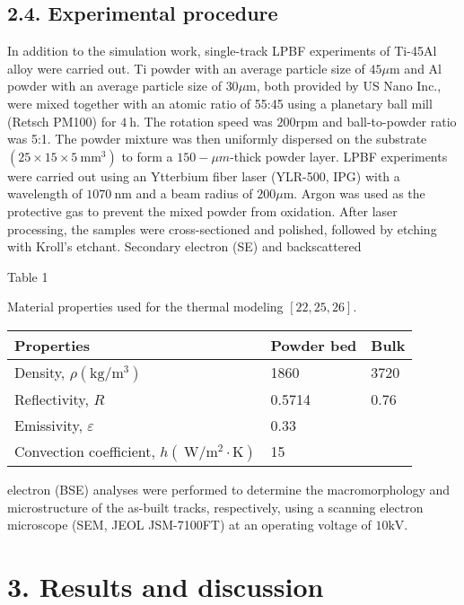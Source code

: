 \documentclass[10pt]{article}
\begin{document}
\subsection*{2.4. Experimental procedure}
In addition to the simulation work, single-track LPBF experiments of Ti-45Al alloy were carried out. Ti powder with an average particle size of $45 \mu \mathrm{m}$ and $\mathrm{Al}$ powder with an average particle size of $30 \mu \mathrm{m}$, both provided by US Nano Inc., were mixed together with an atomic ratio of 55:45 using a planetary ball mill (Retsch PM100) for $4 \mathrm{~h}$. The rotation speed was $200 \mathrm{rpm}$ and ball-to-powder ratio was 5:1. The powder mixture was then uniformly dispersed on the substrate $\left(25 \times 15 \times 5 \mathrm{~mm}^{3}\right)$ to form a $150-\mu m$-thick powder layer. LPBF experiments were carried out using an Ytterbium fiber laser (YLR-500, IPG) with a wavelength of $1070 \mathrm{~nm}$ and a beam radius of $200 \mu \mathrm{m}$. Argon was used as the protective gas to prevent the mixed powder from oxidation. After laser processing, the samples were cross-sectioned and polished, followed by etching with Kroll's etchant. Secondary electron (SE) and backscattered

Table 1

Material properties used for the thermal modeling $[22,25,26]$.

\begin{center}
\begin{tabular}{lll}
\hline
Properties & Powder bed & Bulk \\
\hline
Density, $\rho\left(\mathrm{kg} / \mathrm{m}^{3}\right)$ & 1860 & 3720 \\
Reflectivity, $R$ & 0.5714 & 0.76 \\
Emissivity, $\varepsilon$ & 0.33 &  \\
Convection coefficient, $h\left(\mathrm{~W} / \mathrm{m}^{2} \cdot \mathrm{K}\right)$ & 15 &  \\
\hline
\end{tabular}
\end{center}

electron (BSE) analyses were performed to determine the macromorphology and microstructure of the as-built tracks, respectively, using a scanning electron microscope (SEM, JEOL JSM-7100FT) at an operating voltage of $10 \mathrm{kV}$.

\section*{3. Results and discussion}
\end{document}
